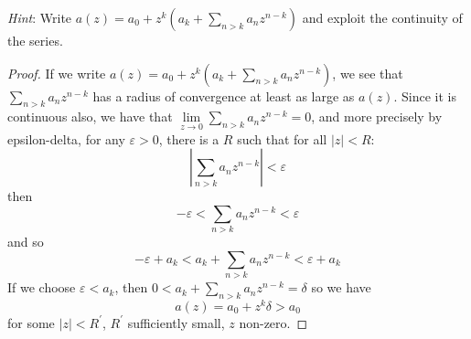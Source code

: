 \documentclass{article}
\begin{document}
\textit{Hint}: Write $a(z) = a_{0} + z^{k}(a_{k} + \sum_{n > k}a_{n}z^{n - k})$ and exploit the continuity of the series.
    \begin{proof}
        If we write $a(z) = a_{0} + z^{k}(a_{k} + \sum_{n > k}a_{n}z^{n - k})$, we see that $\sum_{n > k}a_{n}z^{n - k}$ has a radius of convergence at least as large as $a(z)$. Since it is continuous also, we have that $\lim\limits_{z \to 0}\sum_{n > k}a_{n}z^{n - k} = 0$, and more precisely by epsilon-delta, for any $\varepsilon > 0$, there is a $R$ such that for all $\lvert z \rvert < R$:
            \begin{equation*}
                \left\lvert \sum_{n > k}a_{n}z^{n - k} \right\rvert < \varepsilon
            \end{equation*}
        then
            \begin{equation*}
                -\varepsilon < \sum_{n > k}a_{n}z^{n - k} < \varepsilon
            \end{equation*}
        and so
            \begin{equation*}
                -\varepsilon + a_{k} < a_{k} + \sum_{n > k} a_{n}z^{n - k} < \varepsilon + a_{k}
            \end{equation*}
        If we choose $\varepsilon < a_{k}$, then $0 < a_{k} + \sum_{n > k}a_{n}z^{n - k} = \delta$ so we have 
            \begin{equation*}
                a(z) = a_{0} + z^{k}\delta > a_{0}
            \end{equation*}
        for some $\lvert z \rvert < R^{\prime}$, $R^{\prime}$ sufficiently small, $z$ non-zero.
    \end{proof}

\newpage
\end{document}
